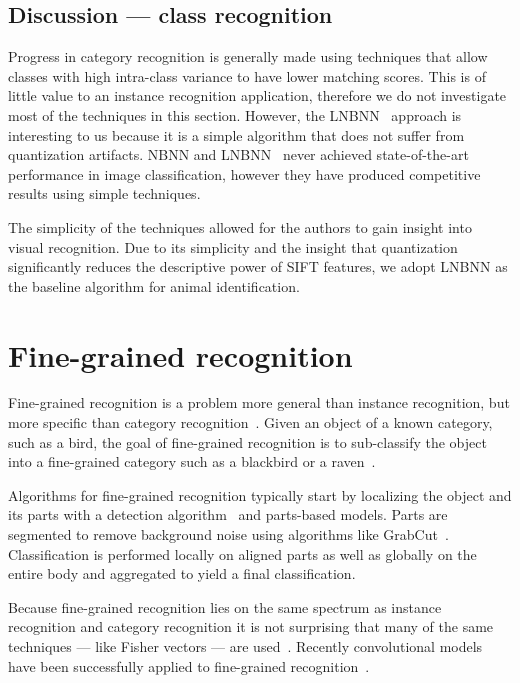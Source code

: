     \subsection{Discussion --- class recognition}

        Progress in category recognition is generally made using techniques that allow classes with high
        intra-class variance to have lower matching scores. This is of little value to an instance recognition
        application, therefore we do not investigate most of the techniques in this section. However, the
        LNBNN~\cite{mccann_local_2012} approach is interesting to us because it is a simple algorithm that does not
        suffer from quantization artifacts. NBNN and LNBNN~\cite{boiman_defense_2008,mccann_local_2012} never
        achieved state-of-the-art performance in image classification, however they have produced competitive
        results using simple techniques.

        The simplicity of the techniques allowed for the authors to gain insight into visual recognition. Due to
        its simplicity and the insight that quantization significantly reduces the descriptive power of SIFT
        features, we adopt LNBNN as the baseline algorithm for animal identification.


\section{Fine-grained recognition}\label{sec:fgr}  

    Fine-grained recognition is a problem more general than instance recognition, but more specific than category
    recognition~\cite{parkhi_cats_2012, berg_poof_2013, gavves_local_2014}. Given an object of a known category,
    such as a bird, the goal of fine-grained recognition is to sub-classify the object into a fine-grained category
    such as a blackbird or a raven~\cite{berg_how_2013}.

    Algorithms for fine-grained recognition typically start by localizing the object and its parts with a detection
    algorithm~\cite{dalal_histograms_2005} and parts-based models. Parts are segmented to remove background noise
    using algorithms like GrabCut~\cite{rother_grabcut_2004}. Classification is performed locally on aligned parts
    as well as globally on the entire body and aggregated to yield a final classification.

    Because fine-grained recognition lies on the same spectrum as instance recognition and category recognition it
    is not surprising that many of the same techniques --- like Fisher vectors --- are
    used~\cite{gosselin_revisiting_2014}.
    Recently convolutional models have been successfully applied to fine-grained
    recognition~\cite{catherine_wah_similarity_2014, branson_bird_2014, zongyuan_ge_modelling_2015,
    zhang_weakly_2015, xiao_application_2015}.

